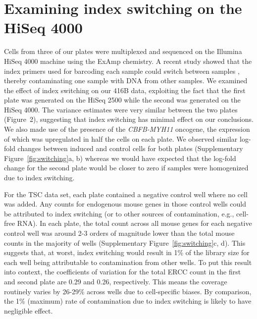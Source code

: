 \documentclass{article}
\newcommand{\figvarestimates}{2}
\begin{document}
\section{Examining index switching on the HiSeq 4000}
Cells from three of our plates were multiplexed and sequenced on the Illumina HiSeq 4000 machine using the ExAmp chemistry.
A recent study showed that the index primers used for barcoding each sample could switch between samples \citep{sinha2017index}, thereby contaminating one sample with DNA from other samples.
We examined the effect of index switching on our 416B data, exploiting the fact that the first plate was generated on the HiSeq 2500 while the second was generated on the HiSeq 4000.
The variance estimates were very similar between the two plates (Figure~\figvarestimates{}), suggesting that index switching has minimal effect on our conclusions.
We also made use of the presence of the \textit{CBFB-MYH11} oncogene, the expression of which was upregulated in half the cells on each plate.
We observed similar log-fold changes between induced and control cells for both plates (Supplementary Figure~\ref{fig:switching}a, b) whereas we would have expected that the log-fold change for the second plate would be closer to zero if samples were homogenized due to index switching.

For the TSC data set, each plate contained a negative control well where no cell was added.
Any counts for endogenous mouse genes in those control wells could be attributed to index switching (or to other sources of contamination, e.g., cell-free RNA).
In each plate, the total count across all mouse genes for each negative control well was around 2-3 orders of magnitude lower than the total mouse counts in the majority of wells (Supplementary Figure~\ref{fig:switching}c, d).
This suggests that, at worst, index switching would result in 1\% of the library size for each well being attributable to contamination from other wells.
To put this result into context, the coefficients of variation for the total ERCC count in the first and second plate are 0.29 and 0.26, respectively.
This means the coverage routinely varies by 26-29\% across wells due to cell-specific biases.
By comparison, the 1\% (maximum) rate of contamination due to index switching is likely to have negligible effect.

\end{document}
